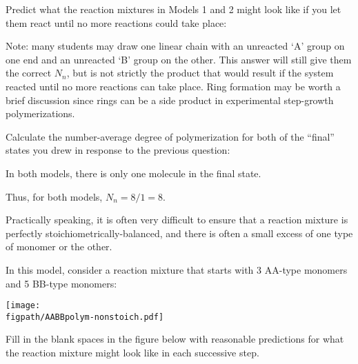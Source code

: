 \begin{activity}
\begin{ctqs}
		\question Predict what the reaction mixtures in Models 1 and 2 might look like if you let them react until no more reactions could take place:
		
	\begin{solution}[2in]
		
		Note: many students may draw one linear chain with an unreacted `A' group on one end and an unreacted `B' group on the other. This answer will still give them the correct $N_n$, but is not strictly the product that would result if the system reacted until no more reactions can take place.  Ring formation may be worth a brief discussion since rings can be a side product in experimental step-growth polymerizations.
	\end{solution}
		
		\question Calculate the number-average degree of polymerization for both of the ``final'' states you drew in response to the previous question:
		
		\begin{solution}[1in]
			In both models, there is only one molecule in the final state.
			
			Thus, for both models, $N_n = 8/1 = 8$.
		\end{solution}
\end{ctqs}

\begin{model}

Practically speaking, it is often very difficult to ensure that a reaction mixture is perfectly stoichiometrically-balanced, and there is often a small excess of one type of monomer or the other.

In this model, consider a reaction mixture that starts with 3 AA-type monomers and 5 BB-type monomers:

\vspace{0.1in}
\centerline{\texttt{[image: \\figpath/AABBpolym-nonstoich.pdf]}}

\end{model}

\begin{ctqs}

		\question Fill in the blank spaces in the figure below with reasonable predictions for what the reaction mixture might look like in each successive step.
		

\end{ctqs}
\end{activity}
